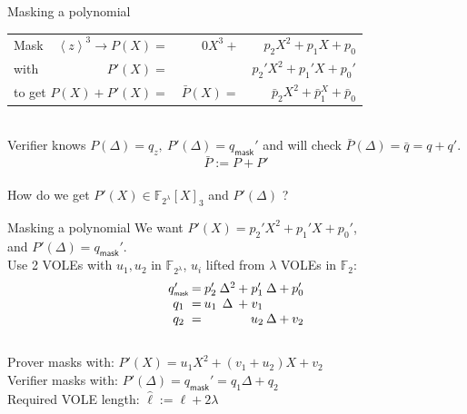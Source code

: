 \begin{frame}{Masking a polynomial}
  \setlength{\tabcolsep}{1pt}
  \begin{tabular}{lrrr}
    Mask & $\left<z\right>^3\rightarrow P(X)=$&$0X^3+$&$p_2X^2+p_1X+p_0$\\
    \pause
    with & $P'(X)=$&&$p_2'X^2+p_1'X+p_0'$ \pause\\ %
    \multicolumn{2}{l}{to get $P(X)+P'(X)=$}&$\bar{P}(X)=$&$\bar{p}_2X^2+\bar{p}_1^X+\bar{p}_0$\\
  \end{tabular}\\[1em]
  \pause
  Verifier knows $P(\Delta)=q_z,\ P'(\Delta)=q_{\scriptscriptstyle\mathsf{mask}}'$ and will check $\bar{P}(\Delta)=\bar{q}=q+q'$.
  $$\bar{P}:=P+P'$$\\[1em]
  \pause
  How do we get $P'(X)\in \mathbb{F}_{2^{\lambda}}[X]_{\scriptscriptstyle3}$ and $P'(\Delta)$ ?
\end{frame}


\begin{frame}{Masking a polynomial}
  We want $P'(X)=p_2'X^2+p_1'X+p_0'$,\\
  and $P'(\Delta)=q_{\scriptscriptstyle\mathsf{mask}}'$.\\[1em]
  \pause
  Use 2 VOLEs with $u_1,u_2$ in $\mathbb{F}_{2^\lambda}$, $u_i$ lifted from $\lambda$ VOLEs in $\mathbb{F}_2$:\\
  $$\setlength{\arraycolsep}{1pt}\begin{array}{ccccccccc}
    q_{\scriptscriptstyle\mathsf{mask}}'&=&p_2'&\Delta^2&+&p_1'&\Delta&+&p_0'\\
    q_1&=&u_1 &\Delta&+&v_1& & & \\
    q_2&=& & & &u_2&\Delta&+&v_2\\
  \end{array}$$\\[1em]
  \pause
  Prover masks with: $P'(X)=u_1X^2+(v_1+u_2)X+v_2$ \\
  Verifier masks with: $P'(\Delta)=q_{\scriptscriptstyle\mathsf{mask}}'=q_1\Delta+q_2$\\[1em]
  \pause
  Required VOLE length: $\hat{\ell}:=\ell+2\lambda$
\end{frame}


